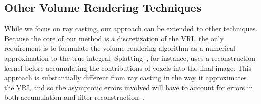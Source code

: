 \subsection{Other Volume Rendering Techniques}

While we focus on ray casting, our approach can be extended to other
techniques. Because the core of our method is a discretization of the
VRI, the only requirement is to formulate the volume rendering
algorithm as a numerical approximation to the true integral.
Splatting~\cite{Westover:1989:IVR:329129.329138}, for instance, uses a
reconstruction kernel before accumulating the contributions of voxels
into the final image. This approach is substantially different from
ray casting in the way it approximates the VRI, and so the asymptotic
errors involved will have to account for errors in both accumulation
and filter reconstruction~\cite{Moller:1996:CLE:236226.236235}.

